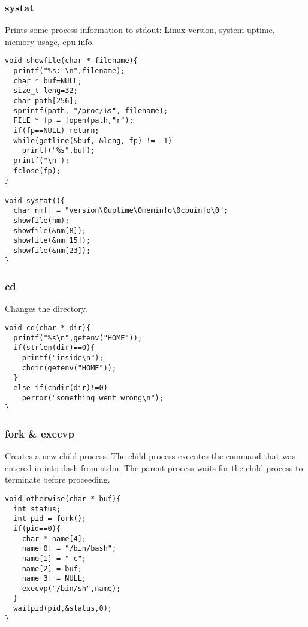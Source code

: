 \documentclass[12pt]{article}
\begin{document}
\noindent \subsubsection*{systat} \par
Prints some process information to stdout: Linux version, 
system uptime, memory usage, cpu info.
\begin{verbatim}
void showfile(char * filename){
  printf("%s: \n",filename);
  char * buf=NULL;
  size_t leng=32;
  char path[256];
  sprintf(path, "/proc/%s", filename);
  FILE * fp = fopen(path,"r");
  if(fp==NULL) return;
  while(getline(&buf, &leng, fp) != -1)
    printf("%s",buf);
  printf("\n");
  fclose(fp);
}

void systat(){
  char nm[] = "version\0uptime\0meminfo\0cpuinfo\0";
  showfile(nm);
  showfile(&nm[8]);
  showfile(&nm[15]);
  showfile(&nm[23]);
}
\end{verbatim}

\noindent \subsubsection*{cd} \par
Changes the directory.
\begin{verbatim}
void cd(char * dir){
  printf("%s\n",getenv("HOME"));
  if(strlen(dir)==0){ 
    printf("inside\n");
    chdir(getenv("HOME"));
  }
  else if(chdir(dir)!=0) 
    perror("something went wrong\n");
}
\end{verbatim}

\noindent \subsubsection*{fork \& execvp} \par
Creates a new child process. The child process executes the command that 
was entered in into {\ttfamily dash} from {\ttfamily stdin}. The parent process waits for the child process to terminate before proceeding.
\begin{verbatim}
void otherwise(char * buf){
  int status;
  int pid = fork();
  if(pid==0){
    char * name[4];
    name[0] = "/bin/bash";
    name[1] = "-c";
    name[2] = buf;
    name[3] = NULL;
    execvp("/bin/sh",name);
  }
  waitpid(pid,&status,0);
}
\end{verbatim}
\end{document}
